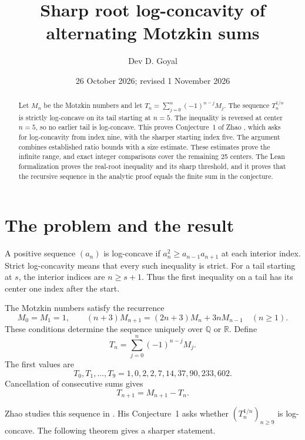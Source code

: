 \documentclass[11pt]{article}
\title{Sharp root log-concavity of alternating Motzkin sums}
\author{Dev D. Goyal}
\date{26 October 2026; revised 1 November 2026}
\begin{document}
\maketitle

\begin{abstract}
Let $M_n$ be the Motzkin numbers and let
$T_n=\sum_{j=0}^n(-1)^{n-j}M_j$.
The sequence $T_n^{1/n}$ is strictly log-concave on its tail
starting at $n=5$. The inequality is reversed at center $n=5$, so no earlier
tail is log-concave. This proves Conjecture~1 of Zhao \cite{Zhao}, which
asks for log-concavity from index nine, with the sharper starting index
five. The argument combines established ratio bounds with a size estimate.
These estimates prove the infinite range, and exact integer comparisons
cover the remaining 25 centers. The Lean formalization proves the
real-root inequality and its sharp threshold, and it proves that the
recursive sequence in the analytic proof equals the finite sum in the
conjecture.
\end{abstract}

\section{The problem and the result}

A positive sequence $(a_n)$ is log-concave if
$a_n^2\ge a_{n-1}a_{n+1}$ at each interior index.
Strict log-concavity means that every such inequality is strict.
For a tail starting at $s$, the interior indices are $n\ge s+1$.
Thus the first inequality on a tail has its center one index after the start.

The Motzkin numbers satisfy the recurrence
\begin{equation}\label{eq:motzkin}
M_0=M_1=1,\qquad
(n+3)M_{n+1}=(2n+3)M_n+3nM_{n-1}\quad(n\ge1).
\end{equation}
These conditions determine the sequence uniquely over $\mathbb Q$ or $\mathbb R$.
Define
\begin{equation}\label{eq:alternating}
T_n=\sum_{j=0}^{n}(-1)^{n-j}M_j.
\end{equation}
The first values are
\[
T_0,T_1,\ldots,T_9=1,0,2,2,7,14,37,90,233,602.
\]
Cancellation of consecutive sums gives
\begin{equation}\label{eq:Trec}
T_{n+1}=M_{n+1}-T_n.
\end{equation}

Zhao studies this sequence in \cite{Zhao}. His Conjecture~1 asks whether
$(T_n^{1/n})_{n\ge9}$ is log-concave. The following theorem gives a sharper statement.
\end{document}
